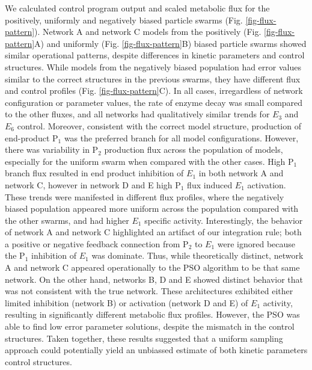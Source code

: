 \documentclass[12pt]{article}
\begin{document}
We calculated control program output and scaled metabolic flux for the positively, uniformly and negatively biased particle swarms (Fig. \ref{fig-flux-pattern}).
Network A and network C models from the positively (Fig. \ref{fig-flux-pattern}A) and uniformly (Fig. \ref{fig-flux-pattern}B) 
biased particle swarms showed similar operational patterns, despite differences in kinetic parameters and control structures.
While models from the negatively biased population had error values similar to the correct structures in the previous swarms,
they have different flux and control profiles (Fig. \ref{fig-flux-pattern}C). 
In all cases, irregardless of network configuration or parameter values, the rate of enzyme decay was small compared to the other fluxes,
and all networks had qualitatively similar trends for $E_{3}$ and $E_{6}$ control.
Moreover, consistent with the correct model structure, production of end-product P$_1$ was the preferred branch for all model configurations.
However, there was variability in P$_{2}$ production flux across the population of models, especially for the uniform swarm when compared with the other cases.
High P$_{1}$ branch flux resulted in end product inhibition of $E_{1}$ in both network A and network C, however in network D and E high P$_1$ flux induced $E_1$ activation. 
These trends were manifested in different flux profiles, where the negatively biased population appeared more uniform across the population compared with the other swarms, and
had higher $E_{1}$ specific activity. 
Interestingly, the behavior of network A and network C highlighted an artifact of our integration rule; 
both a positive or negative feedback connection from P$_2$ to $E_{1}$ were ignored because the P$_{1}$ inhibition of $E_{1}$ was dominate.  
Thus, while theoretically distinct, network A and network C appeared operationally to the PSO algorithm to be that same network.
On the other hand, networks B, D and E showed distinct behavior that was not consistent with the true network.  
These architectures exhibited either limited inhibition (network B) or activation (network D and E) of $E_{1}$ activity, resulting in significantly different
metabolic flux profiles. However, the PSO was able to find low error parameter solutions, despite the mismatch in the control structures.
Taken together, these results suggested that a uniform sampling approach could potentially yield an unbiassed estimate of both kinetic parameters control structures. 

\clearpage
\end{document}
